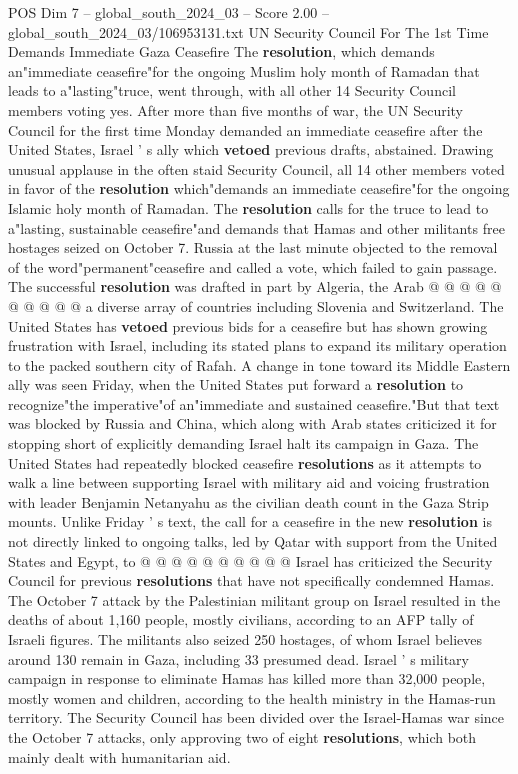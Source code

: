 \begin{textsample}{POS Dim 7 – global\_south\_2024\_03 – Score 2.00 – global\_south\_2024\_03/106953131.txt}  \label{ex:f7_pos_029}
UN Security Council For The 1st Time Demands Immediate Gaza Ceasefire The \textbf{resolution}, which demands an"immediate ceasefire"for the ongoing Muslim holy month of Ramadan that leads to a"lasting"truce, went through, with all other 14 Security Council members voting yes.
After more than five months of war, the UN Security Council for the first time Monday demanded an immediate ceasefire after the United States, Israel ' s ally which \textbf{vetoed} previous drafts, abstained.
Drawing unusual applause in the often staid Security Council, all 14 other members voted in favor of the \textbf{resolution} which"demands an immediate ceasefire"for the ongoing Islamic holy month of Ramadan.
The \textbf{resolution} calls for the truce to lead to a"lasting, sustainable ceasefire"and demands that Hamas and other militants free hostages seized on October 7.
Russia at the last minute objected to the removal of the word"permanent"ceasefire and called a vote, which failed to gain passage.
The successful \textbf{resolution} was drafted in part by Algeria, the Arab @ @ @ @ @ @ @ @ @ @ a diverse array of countries including Slovenia and Switzerland.
The United States has \textbf{vetoed} previous bids for a ceasefire but has shown growing frustration with Israel, including its stated plans to expand its military operation to the packed southern city of Rafah.
A change in tone toward its Middle Eastern ally was seen Friday, when the United States put forward a \textbf{resolution} to recognize"the imperative"of an"immediate and sustained ceasefire."But that text was blocked by Russia and China, which along with Arab states criticized it for stopping short of explicitly demanding Israel halt its campaign in Gaza.
The United States had repeatedly blocked ceasefire \textbf{resolutions} as it attempts to walk a line between supporting Israel with military aid and voicing frustration with leader Benjamin Netanyahu as the civilian death count in the Gaza Strip mounts.
Unlike Friday ' s text, the call for a ceasefire in the new \textbf{resolution} is not directly linked to ongoing talks, led by Qatar with support from the United States and Egypt, to @ @ @ @ @ @ @ @ @ @ Israel has criticized the Security Council for previous \textbf{resolutions} that have not specifically condemned Hamas.
The October 7 attack by the Palestinian militant group on Israel resulted in the deaths of about 1,160 people, mostly civilians, according to an AFP tally of Israeli figures.
The militants also seized 250 hostages, of whom Israel believes around 130 remain in Gaza, including 33 presumed dead.
Israel ' s military campaign in response to eliminate Hamas has killed more than 32,000 people, mostly women and children, according to the health ministry in the Hamas-run territory.
The Security Council has been divided over the Israel-Hamas war since the October 7 attacks, only approving two of eight \textbf{resolutions}, which both mainly dealt with humanitarian aid.

\end{textsample}
